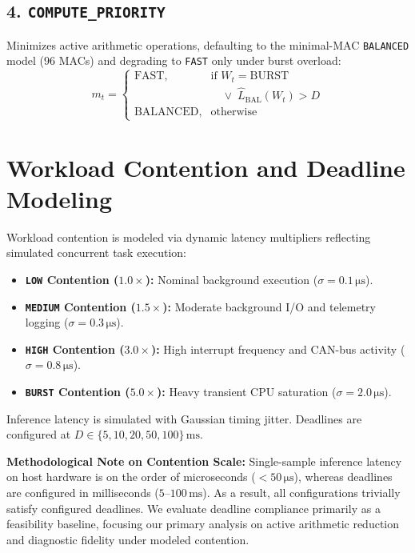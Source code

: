 \documentclass[journal]{IEEEtran}
\begin{document}
\subsection{4. \texttt{COMPUTE\_PRIORITY}}
Minimizes active arithmetic operations, defaulting to the minimal-MAC \texttt{BALANCED} model ($96$ MACs) and degrading to \texttt{FAST} only under burst overload:
\begin{equation}
    m_t = \begin{cases}
    \text{FAST}, & \text{if } W_t = \text{BURST} \\
                 & \quad \lor\; \hat{L}_{\text{BAL}}(W_t) > D \\
    \text{BALANCED}, & \text{otherwise}
    \end{cases}
\end{equation}

\section{Workload Contention and Deadline Modeling}
Workload contention is modeled via dynamic latency multipliers reflecting simulated concurrent task execution:
\begin{itemize}
    \item \textbf{\texttt{LOW} Contention ($1.0\times$):} Nominal background execution ($\sigma = 0.1\,\si{\micro\second}$).
    \item \textbf{\texttt{MEDIUM} Contention ($1.5\times$):} Moderate background I/O and telemetry logging ($\sigma = 0.3\,\si{\micro\second}$).
    \item \textbf{\texttt{HIGH} Contention ($3.0\times$):} High interrupt frequency and CAN-bus activity ($\sigma = 0.8\,\si{\micro\second}$).
    \item \textbf{\texttt{BURST} Contention ($5.0\times$):} Heavy transient CPU saturation ($\sigma = 2.0\,\si{\micro\second}$).
\end{itemize}
Inference latency is simulated with Gaussian timing jitter. Deadlines are configured at $D \in \{5, 10, 20, 50, 100\}\,\text{ms}$.

\textbf{Methodological Note on Contention Scale:} Single-sample inference latency on host hardware is on the order of microseconds ($<50\,\si{\micro\second}$), whereas deadlines are configured in milliseconds ($5$--$100\,\text{ms}$). As a result, all configurations trivially satisfy configured deadlines. We evaluate deadline compliance primarily as a feasibility baseline, focusing our primary analysis on active arithmetic reduction and diagnostic fidelity under modeled contention.
\end{document}
